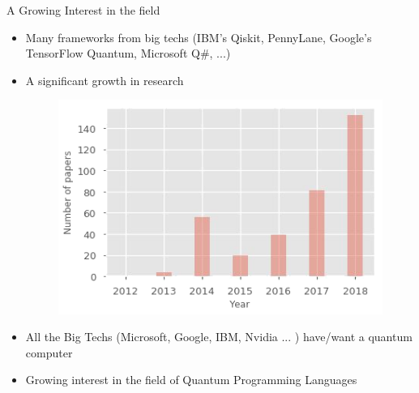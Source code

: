 \begin{frame}[fragile]{A Growing Interest in the field}
	\begin{itemize}
	 \item Many frameworks from big techs (IBM's Qiskit, PennyLane, Google's TensorFlow Quantum, Microsoft Q\#, ...)
	 \item  A significant growth in research
	   \begin{figure}[!htb]
	           \includegraphics[width=0.5\linewidth]{plot_interest}\quad
	    \end{figure}
	 \item  All the Big Techs (Microsoft, Google, IBM, Nvidia ... ) have/want a quantum computer
	 \item  Growing interest in the field of Quantum Programming Languages
	\end{itemize}
\end{frame}